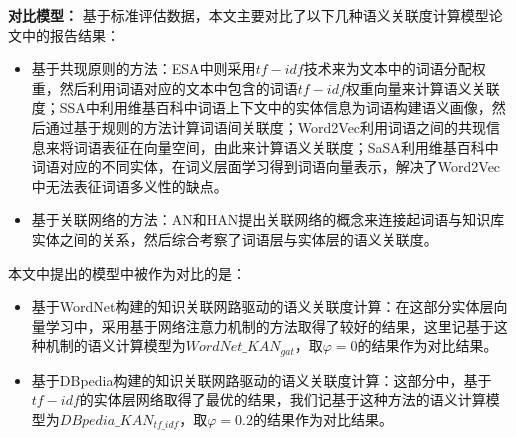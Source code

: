 \textbf{对比模型：}
基于标准评估数据，本文主要对比了以下几种语义关联度计算模型论文中的报告结果：
\begin{itemize}
    \item 基于共现原则的方法：ESA\cite{aaai/StrubeP06}中则采用$tf-idf$技术来为文本中的词语分配权重，然后利用词语对应的文本中包含的词语$tf-idf$权重向量来计算语义关联度；SSA\cite{aaai/HassanM11}中利用维基百科中词语上下文中的实体信息为词语构建语义画像，然后通过基于规则的方法计算词语间关联度；Word2Vec\cite{corr/Mikolov13}利用词语之间的共现信息来将词语表征在向量空间，由此来计算语义关联度；SaSA\cite{aaai/WuG15}利用维基百科中词语对应的不同实体，在词义层面学习得到词语向量表示，解决了Word2Vec中无法表征词语多义性的缺点。
    \item 基于关联网络的方法：AN\cite{aaai/ZhangZH15}和HAN\cite{aaai/GongXH18}提出关联网络的概念来连接起词语与知识库实体之间的关系，然后综合考察了词语层与实体层的语义关联度。
\end{itemize}

本文中提出的模型中被作为对比的是：
\begin{itemize}
    \item 基于WordNet构建的知识关联网路驱动的语义关联度计算：在这部分实体层向量学习中，采用基于网络注意力机制的方法取得了较好的结果，这里记基于这种机制的语义计算模型为$WordNet\_KAN_{gat}$，取$\varphi=0$的结果作为对比结果。
    \item 基于DBpedia构建的知识关联网路驱动的语义关联度计算：这部分中，基于$tf-idf$的实体层网络取得了最优的结果，我们记基于这种方法的语义计算模型为$DBpedia\_KAN_{tf\_idf}$，取$\varphi=0.2$的结果作为对比结果。
\end{itemize}


